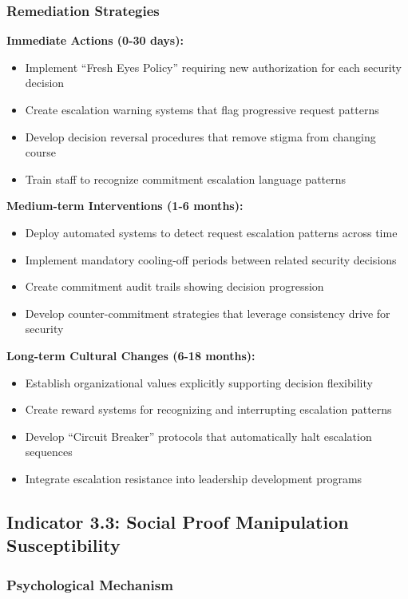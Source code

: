 \documentclass[11pt,a4paper]{article}
\begin{document}
\subsubsection{Remediation Strategies}

\textbf{Immediate Actions (0-30 days):}
\begin{itemize}
\item Implement ``Fresh Eyes Policy'' requiring new authorization for each security decision
\item Create escalation warning systems that flag progressive request patterns
\item Develop decision reversal procedures that remove stigma from changing course
\item Train staff to recognize commitment escalation language patterns
\end{itemize}

\textbf{Medium-term Interventions (1-6 months):}
\begin{itemize}
\item Deploy automated systems to detect request escalation patterns across time
\item Implement mandatory cooling-off periods between related security decisions
\item Create commitment audit trails showing decision progression
\item Develop counter-commitment strategies that leverage consistency drive for security
\end{itemize}

\textbf{Long-term Cultural Changes (6-18 months):}
\begin{itemize}
\item Establish organizational values explicitly supporting decision flexibility
\item Create reward systems for recognizing and interrupting escalation patterns
\item Develop ``Circuit Breaker'' protocols that automatically halt escalation sequences
\item Integrate escalation resistance into leadership development programs
\end{itemize}

\subsection{Indicator 3.3: Social Proof Manipulation Susceptibility}

\subsubsection{Psychological Mechanism}
\end{document}
